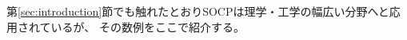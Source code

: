 \documentclass[11pt,a4paper,dvipdfmx,titlepage,uplatex]{jsarticle}
\theoremstyle{mystyle}
\newcommand{\0}{\mathbf{0}}
\def\x{\mbox{\boldmath $x$}}
\begin{document}
%

第\ref{sec:introduction}節でも触れたとおりSOCPは理学・工学の幅広い分野へと応用されているが、
その数例をここで紹介する。
\end{document}
